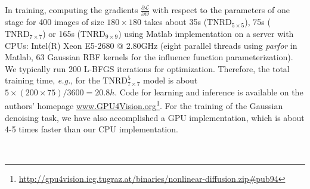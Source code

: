 \documentclass[10pt,journal,compsoc]{IEEEtran}
\newcommand{\cL}{\mathcal{L}}
\newcommand{\eg}{\emph{e.g.}}
\newcommand{\ie}{\emph{i.e.}}
\begin{document}
In training, computing the gradients $\frac{\partial \cL}{\partial \Theta}$ with respect to the parameters of one stage 
for 400 images of size $180 \times 180$ takes about 35s ($\text{TNRD}_{5 \times 5}$), 75s ($\text{TNRD}_{7 \times 7}$) or 
165s ($\text{TNRD}_{9 \times 9}$) using Matlab implementation on a server with CPUs: Intel(R) Xeon E5-2680 @ 2.80GHz 
(eight parallel threads using \textit{parfor} in Matlab, 
63 Gaussian RBF kernels for the influence function parameterization). We typically run 200 L-BFGS 
iterations for optimization. Therefore, the total training time, \eg, for the $\text{TNRD}^5_{7 \times 7}$ model is about 
$5 \times (200 \times 75)/3600 = 20.8h$. Code for learning and inference is available on the authors' homepage 
\url{www.GPU4Vision.org}\footnote{
\url{http://gpu4vision.icg.tugraz.at/binaries/nonlinear-diffusion.zip\#pub94}}. 
For the training of the Gaussian denoising task, we have also accomplished a GPU implementation, 
which is about 4-5 times faster than our CPU implementation. 
\begin{figure*}[t!]
\centering
{}\hfill
{}\hfill
{}\hfill
{}\hfill
{}\hfill
{}\\
\vspace*{-0.2cm}
\caption{An image denoising example for noise level $\sigma = 25$ 
to illustrate how our learned $\text{TNRD}_{5 \times 5}^5$ works. (b) - (e) are 
intermediate results at stage 1 - 4, and (f) is the output of stage 5, \ie, the final denoising result.}\label{fig:denoising}
\vspace*{-0.25cm}
\end{figure*}
\end{document}
